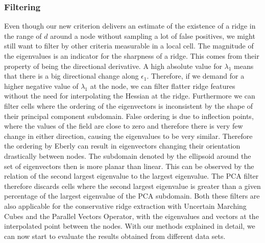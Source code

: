 \subsubsection{Filtering}

Even though our new criterion delivers an estimate of the existence of a
ridge in the range of $d$ around a node without sampling a lot of false
positives, we might still want to filter by other criteria measurable in
a local cell. The magnitude of the eigenvalues is an indicator for the
sharpness of a ridge. This comes from their property of being the
directional derivative. A high absolute value for $\lambda_1$ means that
there is a big directional change along $\epsilon_1$. Therefore, if we
demand for a higher negative value of $\lambda_1$ at the node, we can
filter flatter ridge features without the need for interpolating the
Hessian at the ridge. Furthermore we can filter cells where the ordering
of the eigenvectors is inconsistent by the shape of their principal
component subdomain. False ordering is due to inflection points, where
the values of the field are close to zero and therefore there is very
few change in either direction, causing the eigenvalues to be very
similar. Therefore the ordering by Eberly can result in eigenvectors
changing their orientation drastically between nodes. The subdomain
denoted by the ellipsoid around the set of eigenvectors then is more
planar than linear. This can be observed by the relation of the second
largest eigenvalue to the largest eigenvalue. The PCA filter therefore
discards cells where the second largest eigenvalue is greater than a
given percentage of the largest eigenvalue of the PCA subdomain. Both
these filters are also applicable for the conservative ridge extraction
with Uncertain Marching Cubes and the Parallel Vectors Operator, with
the eigenvalues and vectors at the interpolated point between the nodes.
With our methods explained in detail, we can now start to evaluate the
results obtained from different data sets.